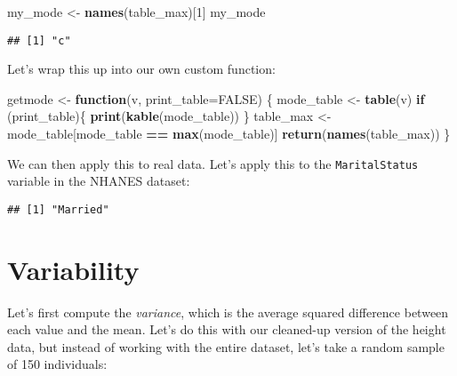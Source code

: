 \documentclass[12pt,]{book}
\newenvironment{Shaded}{\begin{snugshade}}{\end{snugshade}}
\newcommand{\ControlFlowTok}[1]{\textcolor[rgb]{0.13,0.29,0.53}{\textbf{#1}}}
\newcommand{\DataTypeTok}[1]{\textcolor[rgb]{0.13,0.29,0.53}{#1}}
\newcommand{\DecValTok}[1]{\textcolor[rgb]{0.00,0.00,0.81}{#1}}
\newcommand{\KeywordTok}[1]{\textcolor[rgb]{0.13,0.29,0.53}{\textbf{#1}}}
\newcommand{\NormalTok}[1]{#1}
\newcommand{\OperatorTok}[1]{\textcolor[rgb]{0.81,0.36,0.00}{\textbf{#1}}}
\newcommand{\OtherTok}[1]{\textcolor[rgb]{0.56,0.35,0.01}{#1}}
\newcommand{\StringTok}[1]{\textcolor[rgb]{0.31,0.60,0.02}{#1}}
\begin{document}
\begin{Shaded}
\begin{Highlighting}[]
\NormalTok{my_mode <-}\StringTok{ }\KeywordTok{names}\NormalTok{(table_max)[}\DecValTok{1}\NormalTok{]}
\NormalTok{my_mode}
\end{Highlighting}
\end{Shaded}

\begin{verbatim}
## [1] "c"
\end{verbatim}

Let's wrap this up into our own custom function:

\begin{Shaded}
\begin{Highlighting}[]
\NormalTok{getmode <-}\StringTok{ }\ControlFlowTok{function}\NormalTok{(v, }\DataTypeTok{print_table=}\OtherTok{FALSE}\NormalTok{) \{}
\NormalTok{  mode_table <-}\StringTok{ }\KeywordTok{table}\NormalTok{(v)}
  \ControlFlowTok{if}\NormalTok{ (print_table)\{}
    \KeywordTok{print}\NormalTok{(}\KeywordTok{kable}\NormalTok{(mode_table))}
\NormalTok{  \}}
\NormalTok{  table_max <-}\StringTok{ }\NormalTok{mode_table[mode_table }\OperatorTok{==}\StringTok{ }\KeywordTok{max}\NormalTok{(mode_table)]}
  \KeywordTok{return}\NormalTok{(}\KeywordTok{names}\NormalTok{(table_max))}
\NormalTok{\}}
\end{Highlighting}
\end{Shaded}

We can then apply this to real data. Let's apply this to the \texttt{MaritalStatus} variable in the NHANES dataset:

\begin{Shaded}
\end{Shaded}

\begin{verbatim}
## [1] "Married"
\end{verbatim}

\hypertarget{variability}{%
\section{Variability}\label{variability}}

Let's first compute the \emph{variance}, which is the average squared difference between each value and the mean. Let's do this with our cleaned-up version of the height data, but instead of working with the entire dataset, let's take a random sample of 150 individuals:
\end{document}
